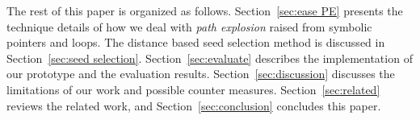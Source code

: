The rest of this paper is organized as follows. Section~\ref{sec:ease PE} presents the technique details of how we deal with \textit{path explosion} raised from symbolic pointers and loops. The distance based seed selection method is discussed in Section~\ref{sec:seed selection}. Section~\ref{sec:evaluate} describes the implementation of our prototype and the evaluation results. Section~\ref{sec:discussion} discusses the limitations of our work and possible counter measures. Section~\ref{sec:related} reviews the related work, and Section~\ref{sec:conclusion} concludes this paper.
